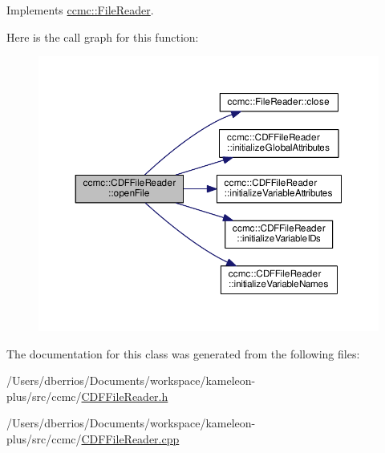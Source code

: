 Implements \hyperlink{classccmc_1_1_file_reader_aa4afaba431365ecd756641e479140768}{ccmc\-::\-File\-Reader}.



Here is the call graph for this function\-:
\nopagebreak
\begin{figure}[H]
\begin{center}
\leavevmode
\includegraphics[width=350pt]{classccmc_1_1_c_d_f_file_reader_a98d1d6bbd26aab8d1e285fa34179dfa8_cgraph}
\end{center}
\end{figure}




The documentation for this class was generated from the following files\-:\begin{DoxyCompactItemize}
\item 
/\-Users/dberrios/\-Documents/workspace/kameleon-\/plus/src/ccmc/\hyperlink{_c_d_f_file_reader_8h}{C\-D\-F\-File\-Reader.\-h}\item 
/\-Users/dberrios/\-Documents/workspace/kameleon-\/plus/src/ccmc/\hyperlink{_c_d_f_file_reader_8cpp}{C\-D\-F\-File\-Reader.\-cpp}\end{DoxyCompactItemize}
